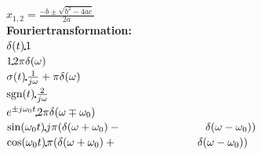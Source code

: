 \begin{landscape}
\begin{minipage}{0.2\linewidth}
$x_{1,2}=\frac{-b\pm \sqrt{b^2-4ac}}{2a}$\\

\textbf{Fouriertransformation:}\\

$\delta(t)\FT 1$\\
$1\FT 2\pi \delta(\omega)$\\
$\sigma(t)\FT \frac{1}{j\omega}+\pi\delta(\omega)$\\
$\text{sgn}(t)\FT \frac{2}{j\omega}$\\
$e^{\pm j \omega_0 t} \FT 2\pi \delta(\omega \mp \omega_0)$\\
$\sin(\omega_0t)\FT j\pi(\delta(\omega +\omega_0)-\newline\text{\hspace{2.7cm}}\delta(\omega -\omega_0))$\\
$\cos(\omega_0t)\FT \pi(\delta(\omega +\omega_0)+\newline\text{\hspace{2.6cm}}\delta(\omega -\omega_0))$\\
\end{minipage}


 


\end{landscape}